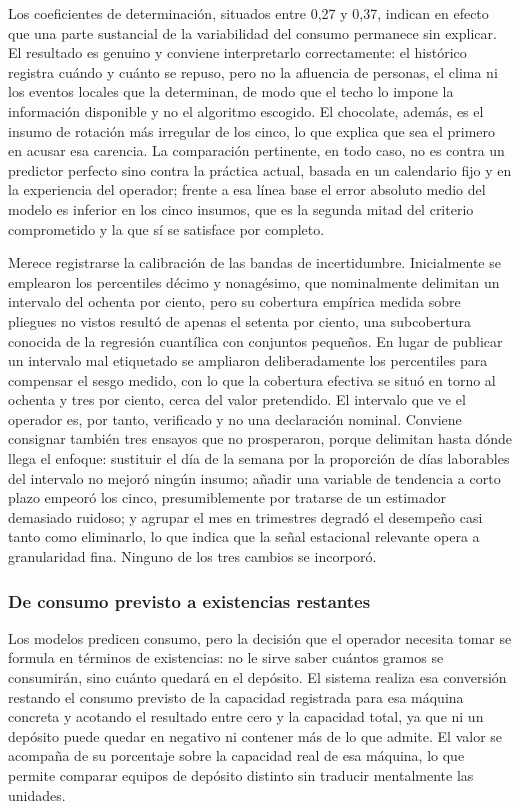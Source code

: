 Los coeficientes de determinación, situados entre 0,27 y 0,37, indican en efecto que una parte sustancial de la variabilidad del consumo permanece sin explicar. El resultado es genuino y conviene interpretarlo correctamente: el histórico registra cuándo y cuánto se repuso, pero no la afluencia de personas, el clima ni los eventos locales que la determinan, de modo que el techo lo impone la información disponible y no el algoritmo escogido. El chocolate, además, es el insumo de rotación más irregular de los cinco, lo que explica que sea el primero en acusar esa carencia. La comparación pertinente, en todo caso, no es contra un predictor perfecto sino contra la práctica actual, basada en un calendario fijo y en la experiencia del operador; frente a esa línea base el error absoluto medio del modelo es inferior en los cinco insumos, que es la segunda mitad del criterio comprometido y la que sí se satisface por completo.

Merece registrarse la calibración de las bandas de incertidumbre. Inicialmente se emplearon los percentiles décimo y nonagésimo, que nominalmente delimitan un intervalo del ochenta por ciento, pero su cobertura empírica medida sobre pliegues no vistos resultó de apenas el setenta por ciento, una subcobertura conocida de la regresión cuantílica con conjuntos pequeños. En lugar de publicar un intervalo mal etiquetado se ampliaron deliberadamente los percentiles para compensar el sesgo medido, con lo que la cobertura efectiva se situó en torno al ochenta y tres por ciento, cerca del valor pretendido. El intervalo que ve el operador es, por tanto, verificado y no una declaración nominal. Conviene consignar también tres ensayos que no prosperaron, porque delimitan hasta dónde llega el enfoque: sustituir el día de la semana por la proporción de días laborables del intervalo no mejoró ningún insumo; añadir una variable de tendencia a corto plazo empeoró los cinco, presumiblemente por tratarse de un estimador demasiado ruidoso; y agrupar el mes en trimestres degradó el desempeño casi tanto como eliminarlo, lo que indica que la señal estacional relevante opera a granularidad fina. Ninguno de los tres cambios se incorporó.

\subsubsection{De consumo previsto a existencias restantes}\label{de-consumo-previsto-a-existencias-restantes}

Los modelos predicen consumo, pero la decisión que el operador necesita tomar se formula en términos de existencias: no le sirve saber cuántos gramos se consumirán, sino cuánto quedará en el depósito. El sistema realiza esa conversión restando el consumo previsto de la capacidad registrada para esa máquina concreta y acotando el resultado entre cero y la capacidad total, ya que ni un depósito puede quedar en negativo ni contener más de lo que admite. El valor se acompaña de su porcentaje sobre la capacidad real de esa máquina, lo que permite comparar equipos de depósito distinto sin traducir mentalmente las unidades.

